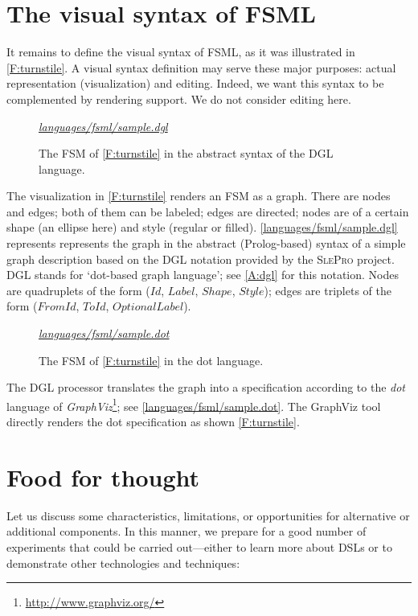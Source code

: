 \documentclass[preprint,authoryear,12pt]{noelsarticle}
\newcommand{\m}[1]{\ensuremath{\mathit{#1}}}
\newcommand{\slepro}{\textsc{SlePro}}
\newcommand{\codefigure}[3]{
\begin{figure}[t!]
\begin{boxedminipage}{\hsize}
\mbox{}\hfill{}{\small\textit{\href{http://github.com/slebok/slepro/tree/master/#2}{#2}}}

\end{boxedminipage}
\caption{#1.}
\label{#2}
\medskip
\end{figure}}
\begin{document}

\section{The visual syntax of FSML}
\label{S:visual}

It remains to define the visual syntax of FSML, as it was illustrated
in \autoref{F:turnstile}. A visual syntax definition may serve these
major purposes: actual representation (visualization) and
editing. Indeed, we want this syntax to be complemented by rendering
support. We do not consider editing here.

\codefigure{%
The FSM of \autoref{F:turnstile} in the abstract syntax of the DGL language}{%
languages/fsml/sample.dgl}{%
prolog}

The visualization in \autoref{F:turnstile} renders an FSM as a
graph. There are nodes and edges; both of them can be labeled; edges
are directed; nodes are of a certain shape (an ellipse here) and style
(regular or
filled). \autoref{languages/fsml/sample.dgl} represents
represents the graph in the abstract (Prolog-based) syntax of a simple
graph description based on the DGL notation provided by the \slepro{}
project. DGL stands for `dot-based graph language'; see \ref{A:dgl}
for this notation. Nodes are quadruplets of the form (\m{Id},
\m{Label}, \m{Shape}, \m{Style}); edges are triplets of the form
(\m{FromId}, \m{ToId}, \m{OptionalLabel}).

\codefigure{%
The FSM of \autoref{F:turnstile} in the dot language}{%
languages/fsml/sample.dot}{%
dot}

The DGL processor translates the graph into a specification according
to the \emph{dot} language of
\emph{GraphViz}\footnote{\url{http://www.graphviz.org/}}; see
\autoref{languages/fsml/sample.dot}. The GraphViz tool
directly renders the dot specification as shown \autoref{F:turnstile}.


\section{Food for thought}
\label{S:concl}

Let us discuss some characteristics, limitations, or opportunities
for alternative or additional components. In this manner, we prepare
for a good number of experiments that could be carried out---either to
learn more about DSLs or to demonstrate other technologies and
techniques:
\end{document}

